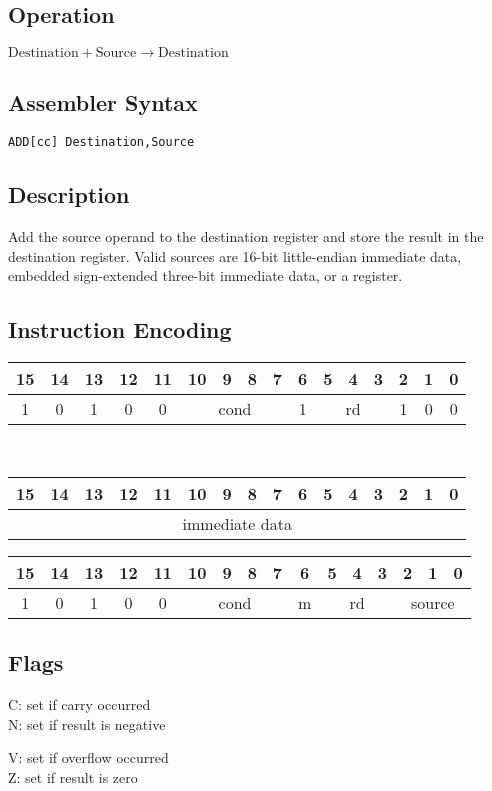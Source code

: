 \documentclass[11pt]{book}
\newcommand*{\encoding}[1]{\noindent
\begin{tabular}{|c|c|c|c|c|c|c|c|c|c|c|c|c|c|c|c|}
\multicolumn{1}{c}{15}&
\multicolumn{1}{c}{14}&
\multicolumn{1}{c}{13}&
\multicolumn{1}{c}{12}&
\multicolumn{1}{c}{11}&
\multicolumn{1}{c}{10}&
\multicolumn{1}{c}{9}&
\multicolumn{1}{c}{8}&
\multicolumn{1}{c}{7}&
\multicolumn{1}{c}{6}&
\multicolumn{1}{c}{5}&
\multicolumn{1}{c}{4}&
\multicolumn{1}{c}{3}&
\multicolumn{1}{c}{2}&
\multicolumn{1}{c}{1}&
\multicolumn{1}{c}{0}\\\hline
#1\\\hline
\end{tabular}}
\newcommand*{\instruction}[2][]{%
  \clearpage
  \thispagestyle{fancy}%
  \fancyhf[HL,HR]{\huge{#2}}%
  \fancyhf[HC]{#1}\addtocounter{section}{1}\noindent
}
\begin{document}

\instruction[Add]{ADD}
\subsection*{Operation}
\(\text{Destination}+\text{Source}\rightarrow\text{Destination}\)

\subsection*{Assembler Syntax}
\texttt{ADD[cc] Destination,Source}

\subsection*{Description}
Add the source operand to the destination register
and store the result in the destination register.
Valid sources are 16-bit little-endian immediate data,
embedded sign-extended three-bit immediate data,
or a register.

\subsection*{Instruction Encoding}
\encoding{1&0&1&0&0%
&\multicolumn{4}{|c|}{cond}%
&1&\multicolumn{3}{|c|}{rd}&1&0&0}\\\null\qquad
\encoding{\multicolumn{16}{|c|}{immediate data}}

\vspace{2\baselineskip}
\encoding{1&0&1&0&0%
&\multicolumn{4}{|c|}{cond}%
&m&\multicolumn{3}{|c|}{rd}&\multicolumn{3}{|c|}{source}}

\subsection*{Flags}
\begin{multicols}{2}\noindent
  C: set if carry occurred\\
  N: set if result is negative

  \columnbreak\noindent
  V: set if overflow occurred\\
  Z: set if result is zero
\end{multicols}
\end{document}
